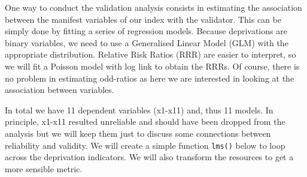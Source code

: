 \documentclass[]{book}
\newenvironment{Shaded}{\begin{snugshade}}{\end{snugshade}}
\newcommand{\ControlFlowTok}[1]{\textcolor[rgb]{0.13,0.29,0.53}{\textbf{#1}}}
\newcommand{\DataTypeTok}[1]{\textcolor[rgb]{0.13,0.29,0.53}{#1}}
\newcommand{\DecValTok}[1]{\textcolor[rgb]{0.00,0.00,0.81}{#1}}
\newcommand{\KeywordTok}[1]{\textcolor[rgb]{0.13,0.29,0.53}{\textbf{#1}}}
\newcommand{\NormalTok}[1]{#1}
\newcommand{\OperatorTok}[1]{\textcolor[rgb]{0.81,0.36,0.00}{\textbf{#1}}}
\newcommand{\StringTok}[1]{\textcolor[rgb]{0.31,0.60,0.02}{#1}}
\begin{document}
One way to conduct the validation analysis consists in estimating the association between the manifest variables of our index with the validator. This can be simply done by fitting a series of regression models. Because deprivations are binary variables, we need to use a Generalised Linear Model (GLM) with the appropriate distribution. Relative Risk Ratios (RRR) are easier to interpret, so we will fit a Poisson model with log link to obtain the RRRs. Of course, there is no problem in estimating odd-ratios as here we are interested in looking at the association between variables.

In total we have 11 dependent variables (x1-x11) and, thus 11 models. In principle, x1-x11 resulted unreliable and should have been dropped from the analysis but we will keep them just to discuss some connections between reliability and validity. We will create a simple function \texttt{lms()} below to loop across the deprivation indicators. We will also transform the resources to get a more sensible metric.

\begin{Shaded}
\end{Shaded}
\end{document}
